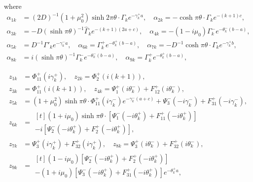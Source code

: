 where
\[
\begin{aligned}
\alpha _{1k} &=(2D)^{-1} (1+\mu _{0}^{2} )\sinh 2\pi \theta \cdot \Gamma _{k} e^{-\gamma _{k}^{+} a} ,\quad   \alpha _{2k} =-\cosh \pi \theta \cdot \Gamma _{k} e^{-(k+1)c} ,
\\
\alpha _{3k} &=-D(\sinh \pi \theta )^{-1} \hat{\Gamma }_{k} e^{-(k+1)(2a+c)} ,\quad     \alpha _{4k} =-(1-i\mu _{0} )\Gamma _{k}^{-} e^{-\theta _{k}^{-} (b-a)} , 
\\
\alpha _{5k}& =D^{-1} \Gamma '_{k} e^{-\gamma _{k}^{-} a} ,\quad     \alpha _{6k} =\Gamma _{k}^{+} e^{-\theta _{k}^{+} (b-a)} ,\quad     \alpha _{7k} =-D^{-1} \cosh \pi \theta \cdot \Gamma _{k} e^{-\gamma _{k}^{+} b} ,
\\
\alpha_{8k} &=i(\sinh \pi \theta )^{-1} \Gamma _{k}^{-} e^{-\theta _{k}^{-} (b-a)} , \quad    \alpha _{9k} =\Gamma _{k}^{+} e^{-\theta _{k}^{+} (b-a)} ,
\end{aligned}
\] 

\begin{align*}
z_{1k} &=\Phi _{11}^{+} (i\gamma _{k}^{+} ),\quad    z_{2k} =\Phi _{2}^{+} (i(k+1)),    
\\
z_{3k}&=\Phi _{11}^{+} (i(k+1)),\quad  z_{4k} =\Psi _{1}^{+} (i\theta _{k}^{-} )+F_{12}^{+} (i\theta _{k}^{-} ),   
\\
z_{5k} &=(1+\mu _{0}^{2} )\sinh \pi \theta \cdot \Phi _{11}^{+} (i\gamma _{k}^{-} )e^{-\gamma _{k}^{-} (a+c)} +\Psi _{3}^{-} (-i\gamma _{k}^{-} )+F_{31}^{+} (-i\gamma _{k}^{-} ),
\\
z_{6k} &=
\begin{multlined}[t]
	(1+i\mu _{0} )\sinh \pi \theta \cdot \left[\Psi _{1}^{-} (-i\theta _{k}^{+} )+F_{11}^{+} (-i\theta _{k}^{+} )\right]
	\\
	-i\left[\Psi _{2}^{-} (-i\theta _{k}^{+} )+F_{2}^{+} (-i\theta _{k}^{+} )\right],
\end{multlined}
\\
z_{7k} &=\Psi _{3}^{+} (i\gamma _{k}^{+} )+F_{32}^{+} (i\gamma _{k}^{+} ), \quad   z_{8k} =\Psi _{3}^{+} (i\theta _{k}^{-} )+F_{32}^{+} (i\theta _{k}^{-} ),
\\
z_{9k} &=
\begin{multlined}[t]
	(1-i\mu _{0} )\left[\Psi _{2}^{-} (-i\theta _{k}^{+} )+F_{2}^{+} (-i\theta _{k}^{+} )\right]
	\\
	-(1+i\mu _{0} )\left[\Psi _{3}^{-} (-i\theta _{k}^{+} )+F_{31}^{+} (-i\theta _{k}^{+} )\right]e^{-\theta _{k}^{+} a} ,
\end{multlined}
\end{align*}


